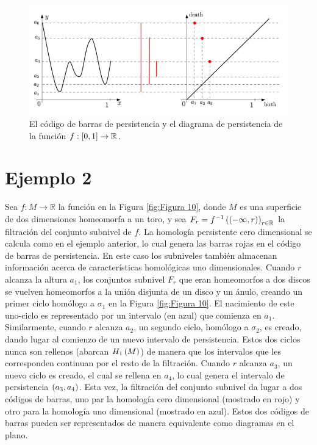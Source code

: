 \begin{figure}[ht]
    \centering
    \includegraphics[width=0.85\linewidth]{./figures/Figura9.png}
    \caption{
        El c\'odigo de barras de persistencia y el diagrama de persistencia de la funci\'on
        $f:\left[0,1\right]\rightarrow\mathbb{R}$.
    }
    \label{fig:Figura 9}
    \vspace{15pt}
\end{figure}

\section*{Ejemplo 2}

Sea $f: M\rightarrow \mathbb{R}$ la funci\'on en la Figura \ref{fig:Figura 10},
donde $M$ es una superficie de dos dimensiones homeomorfa a un toro,
y sea $F_{r} = f^{-1}\left(\left(-\infty,r\right)\right)_{r\in \mathbb{R}}$ la filtraci\'on del conjunto subnivel de $f$.
La homolog\'ia persistente cero dimensional se calcula como en el ejemplo anterior,
lo cual genera las barras rojas en el c\'odigo de barras de persistencia.
En este caso los subniveles tambi\'en almacenan informaci\'on acerca de caracter\'isticas homol\'ogicas uno dimensionales.
Cuando $r$ alcanza la altura $a_{1}$,
los conjuntos subnivel $F_{r}$ que eran homeomorfos a dos discos se vuelven homeomorfos a la uni\'on disjunta de un disco y un \'anulo,
creando un primer ciclo hom\'ologo a $\sigma_{1}$ en la Figura \ref{fig:Figura 10}.
El nacimiento de este uno-ciclo es representado por un intervalo (en azul) que comienza en $a_{1}$.
Similarmente, cuando $r$ alcanza $a_{2}$, un segundo ciclo, hom\'ologo a $\sigma_{2}$, es creado,
dando lugar al comienzo de un nuevo intervalo de persistencia.
Estos dos ciclos nunca son rellenos (abarcan $H_{1}\left(M\right)$) de manera que los intervalos que les corresponden continuan por el resto de la filtraci\'on.
Cuando $r$ alcanza $a_{3}$, un nuevo ciclo es creado, el cual se rellena en $a_{4}$,
lo cual genera el intervalo de persistencia $\left(a_{3},a_{4}\right)$.
Esta vez, la filtraci\'on del conjunto subnivel da lugar a dos c\'odigos de barras,
uno par la homolog\'ia cero dimensional (mostrado en rojo) y otro para la homolog\'ia uno dimensional (mostrado en azul).
Estos dos c\'odigos de barras pueden ser representados de manera equivalente como diagramas en el plano. 

